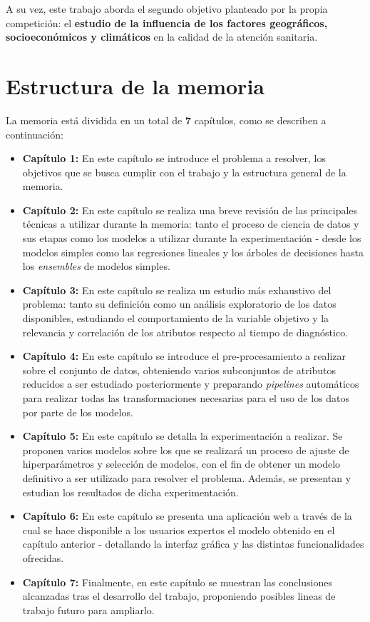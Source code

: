 A su vez, este trabajo aborda el segundo objetivo planteado por la propia competición: el \textbf{estudio de la influencia de los factores geográficos, socioeconómicos y climáticos} en la calidad de la atención sanitaria.

\section{Estructura de la memoria}

La memoria está dividida en un total de \textbf{7} capítulos, como se describen a continuación:

\begin{itemize}
	\item \textbf{Capítulo 1:} En este capítulo se introduce el problema a resolver, los objetivos que se busca cumplir con el trabajo y la estructura general de la memoria.
	\item \textbf{Capítulo 2:} En este capítulo se realiza una breve revisión de las principales técnicas a utilizar durante la memoria: tanto el proceso de ciencia de datos y sus etapas como los modelos a utilizar durante la experimentación - desde los modelos simples como las regresiones lineales y los árboles de decisiones hasta los \textit{ensembles} de modelos simples.
	\item \textbf{Capítulo 3:} En este capítulo se realiza un estudio más exhaustivo del problema: tanto su definición como un análisis exploratorio de los datos disponibles, estudiando el comportamiento de la variable objetivo y la relevancia y correlación de los atributos respecto al tiempo de diagnóstico.
	\item \textbf{Capítulo 4:} En este capítulo se introduce el pre-procesamiento a realizar sobre el conjunto de datos, obteniendo varios subconjuntos de atributos reducidos a ser estudiado posteriormente y preparando \textit{pipelines} automáticos para realizar todas las transformaciones necesarias para el uso de los datos por parte de los modelos.
	\item \textbf{Capítulo 5:} En este capítulo se detalla la experimentación a realizar. Se proponen varios modelos sobre los que se realizará un proceso de ajuste de hiperparámetros y selección de modelos, con el fin de obtener un modelo definitivo a ser utilizado para resolver el problema. Además, se presentan y estudian los resultados de dicha experimentación.
	\item \textbf{Capítulo 6:} En este capítulo se presenta una aplicación web a través de la cual se hace disponible a los usuarios expertos el modelo obtenido en el capítulo anterior - detallando la interfaz gráfica y las distintas funcionalidades ofrecidas.
	\item \textbf{Capítulo 7:} Finalmente, en este capítulo se muestran las conclusiones alcanzadas tras el desarrollo del trabajo, proponiendo posibles lineas de trabajo futuro para ampliarlo.
\end{itemize}
